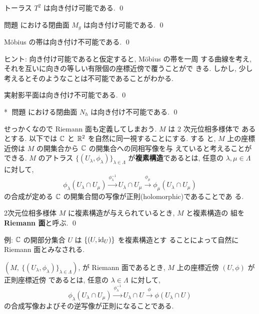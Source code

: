 \documentclass[12pt,twoside]{jarticle}
\def\qstar#1{$\!\!\!$#1$\;$}
\def\id{\text{\rm id}}
\def\R{{\Bbb R}} %
\def\C{{\Bbb C}} %
\begin{document}
\begin{question}
  トーラス $T^2$ は向き付け可能である. \qed
\end{question}

\begin{question}
  問題  における閉曲面 $M_g$ は向き付け可能である. \qed
\end{question}

\begin{question}
  M\"obius の帯は向き付け不可能である. \qed
\end{question}

\noindent ヒント: 向き付け可能であると仮定すると, M\"obius の帯を一周
する曲線を考え, それを互いに向きの等しい有限個の座標近傍で覆うことがで
きる. しかし, 少し考えるとそのようなことは不可能であることがわかる.

\begin{question}
  実射影平面は向き付け不可能である. \qed
\end{question}

\begin{question}\qstar{*}
  問題  における閉曲面 $N_h$ は向き付け不可能である. \qed
\end{question}

せっかくなので Riemann 面も定義してしまおう. $M$ は 2 次元位相多様体で
あるとする. 以下では $\C$ と $\R^2$ を自然に同一視することにする. する
と, $M$ 上の座標近傍は $M$ の開集合から $\C$ の開集合への同相写像を与
えていると考えることができる. $M$ のアトラス %
$\{(U_\lambda,\phi_\lambda)\}_{\lambda\in\Lambda}$ %
が{\bf 複素構造}であるとは, 任意の $\lambda, \mu \in \Lambda$ に対して,
\[
  \phi_\lambda(U_\lambda\cap U_\mu)
  \overset{\phi_\lambda^{-1}}\longrightarrow
  U_\lambda\cap U_\mu
  \overset{\phi_\mu}\longrightarrow
  \phi_\mu(U_\lambda\cap U_\mu)
\] %
の合成が定める $\C$ の開集合間の写像が正則(holomorphic)であることであ
る.

\begin{Definition}
  2次元位相多様体 $M$ に複素構造が与えられているとき, $M$ と複素構造の
  組を {\bf Riemann 面}と呼ぶ. \qed
\end{Definition}

\noindent 例: $\C$ の開部分集合 $U$ は $\{(U,\id_U)\}$ を複素構造とす
ることによって自然に Riemann 面とみなされる.

$(M,\ \{(U_\lambda,\phi_\lambda)\}_{\lambda\in\Lambda})$, %
が Riemann 面であるとき, $M$ 上の座標近傍 $(U,\phi)$ が正則座標近傍
であるとは,%
任意の $\lambda\in\Lambda$ に対して,
\[
  \phi_\lambda(U_\lambda\cap U_\mu)
  \overset{\phi_\lambda^{-1}}\longrightarrow
  U_\lambda\cap U
  \overset{\phi}\longrightarrow
  \phi(U_\lambda\cap U)
\]%
の合成写像およびその逆写像が正則になることである.
\end{document}
